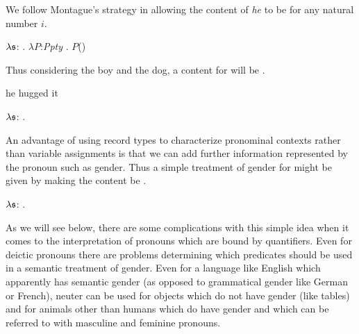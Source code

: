 We follow Montague's strategy in allowing the content of \textit{he}
to be \nexteg{} for any natural number $i$.
\begin{ex}
$\lambda\frak{s}$: . 
        $\lambda P$:\textit{Ppty}
        . $P$()
\label{ex:pronoun-cont}
\end{ex} 
Thus considering the boy and the dog, a
content for  will be .
\begin{ex} 
\begin{subex} 
 
\item he hugged it 
 
\item $\lambda\frak{s}$:
                                 . 
 
\end{subex} 
   
\end{ex} 
An advantage of using record types to characterize pronominal contexts
rather than variable assignments is that we can add further
information represented by the pronoun such as gender.   Thus a simple
treatment of gender for \preveg{} might be given by making the content
be \nexteg{}.
\begin{ex} 
$\lambda\frak{s}$:
                                 . 
\end{ex} 
As we will see below, there are some complications with this simple
idea when it comes to the interpretation of pronouns which are bound
by quantifiers.  Even for deictic pronouns there are problems
determining which predicates should be used in a semantic treatment of
gender.  Even for a language like English which apparently has
semantic gender (as opposed to grammatical gender like German or
French), neuter can be used for objects which do not have gender (like
tables) and for animals other than humans which do have gender and
which can be referred to with masculine and feminine pronouns.

